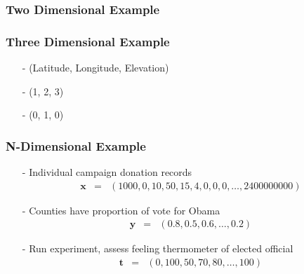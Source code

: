 \documentclass{beamer}
\numberwithin{equation}{section}
\begin{document}
\begin{frame}
\frametitle{Two Dimensional Example}



\end{frame}

\begin{frame}
\frametitle{Three Dimensional Example}


\begin{itemize}
\item[-] (Latitude, Longitude, Elevation)
\item[-] (1, 2, 3)
\item[-] (0, 1, 0)
\end{itemize}


\end{frame}


\begin{frame}
\frametitle{N-Dimensional Example}

\begin{itemize}
\item[-]  Individual campaign donation records
\begin{eqnarray}
\boldsymbol{x} & = & (1000, 0, 10, 50, 15, 4, 0, 0, 0, \hdots, 2400000000)\nonumber 
\end{eqnarray}
\item[-] Counties have proportion of vote for Obama
\begin{eqnarray}
\boldsymbol{y} & = & (0.8, 0.5, 0.6, \hdots, 0.2) \nonumber 
\end{eqnarray}
\item[-] Run experiment, assess feeling thermometer of elected official
\begin{eqnarray}
\boldsymbol{t} & = & (0, 100, 50, 70, 80, \hdots, 100) \nonumber 
\end{eqnarray}
\end{itemize}
\end{frame}
\end{document}

